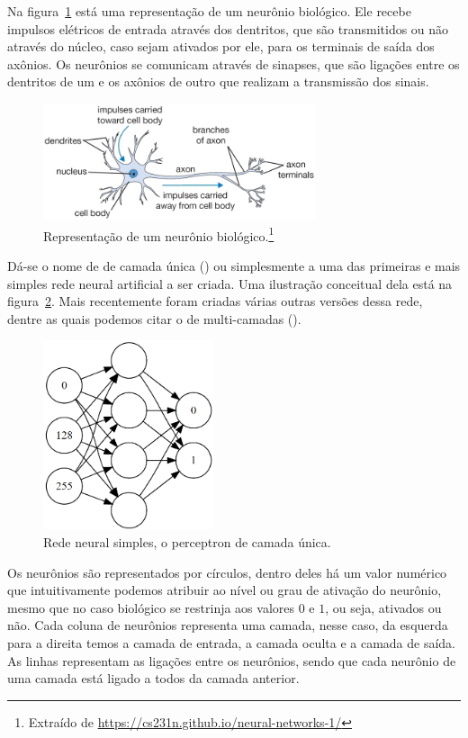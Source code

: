 Na figura~\ref{fig:neuron} está uma representação de um neurônio biológico. Ele recebe impulsos elétricos de entrada através dos dentritos, que são transmitidos ou não através do núcleo, caso sejam ativados por ele, para os terminais de saída dos axônios. Os neurônios se comunicam através de sinapses, que são ligações entre os dentritos de um e os axônios de outro que realizam a transmissão dos sinais. 

\begin{figure}[htb]
\centering
\includegraphics[width=8cm]{figuras/neuron}
\caption{Representação de um neurônio biológico.\footnote{Extraído de \url{https://cs231n.github.io/neural-networks-1/}}}
\label{fig:neuron}
\end{figure}

Dá-se o nome de  de camada única () ou simplesmente  a uma das primeiras e mais simples rede neural artificial a ser criada. Uma ilustração conceitual dela está na figura~\ref{fig:perceptron}. Mais recentemente foram criadas várias outras versões dessa rede, dentre as quais podemos citar o  de multi-camadas (). 

\begin{figure}[htb]
\centering
\includegraphics[width=5cm]{figuras/perceptron}
\caption{Rede neural simples, o perceptron de camada única.}
\label{fig:perceptron}
\end{figure}

Os neurônios são representados por círculos, dentro deles há um valor numérico que intuitivamente podemos atribuir ao nível ou grau de ativação do neurônio, mesmo que no caso biológico se restrinja aos valores $0$ e $1$, ou seja, ativados ou não. Cada coluna de neurônios representa uma camada, nesse caso, da esquerda para a direita temos a camada de entrada, a camada oculta e a camada de saída. As linhas representam as ligações entre os neurônios, sendo que cada neurônio de uma camada está ligado a todos da camada anterior.

